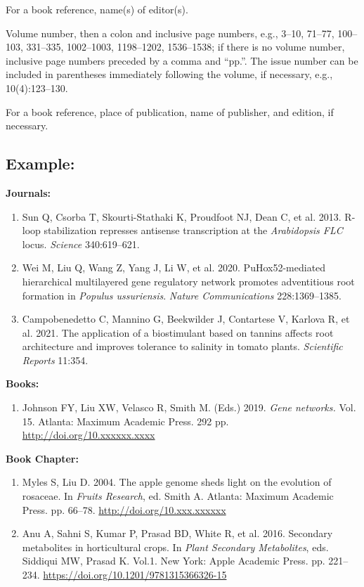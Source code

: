\documentclass[12pt,a4paper]{article}
\begin{document}
For a book reference, name(s) of editor(s).

Volume number, then a colon and inclusive page numbers, e.g., 3--10, 71--77, 100--103, 331--335, 1002--1003, 1198--1202, 1536--1538; if there is no volume number, inclusive page numbers preceded by a comma and ``pp.''. The issue number can be included in parentheses immediately following the volume, if necessary, e.g., 10(4):123--130.

For a book reference, place of publication, name of publisher, and edition, if necessary.

\subsection*{Example:}

\textbf{Journals:}

\begin{enumerate}
\renewcommand{\labelenumi}{[\theenumi].}
    \item Sun Q, Csorba T, Skourti-Stathaki K, Proudfoot NJ, Dean C, et al. 2013. R-loop stabilization represses antisense transcription at the \textit{Arabidopsis FLC} locus. \textit{Science} 340:619--621.
    \item Wei M, Liu Q, Wang Z, Yang J, Li W, et al. 2020. PuHox52-mediated hierarchical multilayered gene regulatory network promotes adventitious root formation in \textit{Populus ussuriensis}. \textit{Nature Communications} 228:1369--1385.
    \item Campobenedetto C, Mannino G, Beekwilder J, Contartese V, Karlova R, et al. 2021. The application of a biostimulant based on tannins affects root architecture and improves tolerance to salinity in tomato plants. \textit{Scientific Reports} 11:354.
\end{enumerate}

\textbf{Books:}

\begin{enumerate}
\renewcommand{\labelenumi}{[\theenumi].}
\setcounter{enumi}{3}
    \item Johnson FY, Liu XW, Velasco R, Smith M. (Eds.) 2019. \textit{Gene networks.} Vol. 15. Atlanta: Maximum Academic Press. 292 pp. \url{http://doi.org/10.xxxxxx.xxxx}
\end{enumerate}

\textbf{Book Chapter:}

\begin{enumerate}
\renewcommand{\labelenumi}{[\theenumi].}
\setcounter{enumi}{4}
    \item Myles S, Liu D. 2004. The apple genome sheds light on the evolution of rosaceae. In \textit{Fruits Research}, ed. Smith A. Atlanta: Maximum Academic Press. pp. 66--78. \url{http://doi.org/10.xxx.xxxxxx}
    \item Anu A, Sahni S, Kumar P, Prasad BD, White R, et al. 2016. Secondary metabolites in horticultural crops. In \textit{Plant Secondary Metabolites}, eds. Siddiqui MW, Prasad K. Vol.1. New York: Apple Academic Press. pp. 221--234. \url{https://doi.org/10.1201/9781315366326-15}
\end{enumerate}
\end{document}
